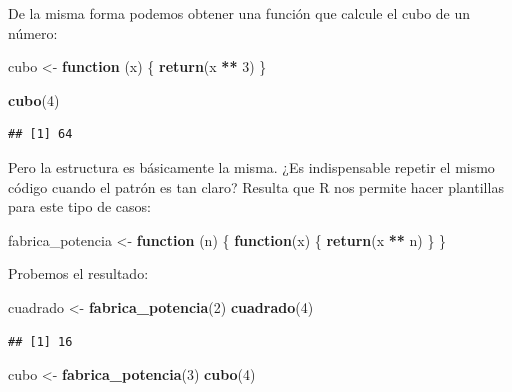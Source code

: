 \documentclass[]{book}
\newenvironment{Shaded}{\begin{snugshade}}{\end{snugshade}}
\newcommand{\KeywordTok}[1]{\textcolor[rgb]{0.13,0.29,0.53}{\textbf{#1}}}
\newcommand{\DecValTok}[1]{\textcolor[rgb]{0.00,0.00,0.81}{#1}}
\newcommand{\StringTok}[1]{\textcolor[rgb]{0.31,0.60,0.02}{#1}}
\newcommand{\ControlFlowTok}[1]{\textcolor[rgb]{0.13,0.29,0.53}{\textbf{#1}}}
\newcommand{\OperatorTok}[1]{\textcolor[rgb]{0.81,0.36,0.00}{\textbf{#1}}}
\newcommand{\NormalTok}[1]{#1}
\theoremstyle{definition}
\theoremstyle{definition}
\theoremstyle{definition}
\theoremstyle{remark}
\begin{document}
De la misma forma podemos obtener una función que calcule el cubo de un
número:

\begin{Shaded}
\begin{Highlighting}[]
\NormalTok{cubo <-}\StringTok{ }\ControlFlowTok{function}\NormalTok{ (x) \{}
  \KeywordTok{return}\NormalTok{(x }\OperatorTok{**}\StringTok{ }\DecValTok{3}\NormalTok{)}
\NormalTok{\}}

\KeywordTok{cubo}\NormalTok{(}\DecValTok{4}\NormalTok{)}
\end{Highlighting}
\end{Shaded}

\begin{verbatim}
## [1] 64
\end{verbatim}

Pero la estructura es básicamente la misma. ¿Es indispensable repetir el
mismo código cuando el patrón es tan claro? Resulta que R nos permite
hacer plantillas para este tipo de casos:

\begin{Shaded}
\begin{Highlighting}[]
\NormalTok{fabrica_potencia <-}\StringTok{ }\ControlFlowTok{function}\NormalTok{ (n) \{}
  \ControlFlowTok{function}\NormalTok{(x) \{}
    \KeywordTok{return}\NormalTok{(x }\OperatorTok{**}\StringTok{ }\NormalTok{n)}
\NormalTok{  \}}
\NormalTok{\}}
\end{Highlighting}
\end{Shaded}

Probemos el resultado:

\begin{Shaded}
\begin{Highlighting}[]
\NormalTok{cuadrado <-}\StringTok{ }\KeywordTok{fabrica_potencia}\NormalTok{(}\DecValTok{2}\NormalTok{)}
\KeywordTok{cuadrado}\NormalTok{(}\DecValTok{4}\NormalTok{)}
\end{Highlighting}
\end{Shaded}

\begin{verbatim}
## [1] 16
\end{verbatim}

\begin{Shaded}
\begin{Highlighting}[]
\NormalTok{cubo <-}\StringTok{ }\KeywordTok{fabrica_potencia}\NormalTok{(}\DecValTok{3}\NormalTok{)}
\KeywordTok{cubo}\NormalTok{(}\DecValTok{4}\NormalTok{)}
\end{Highlighting}
\end{Shaded}
\end{document}
